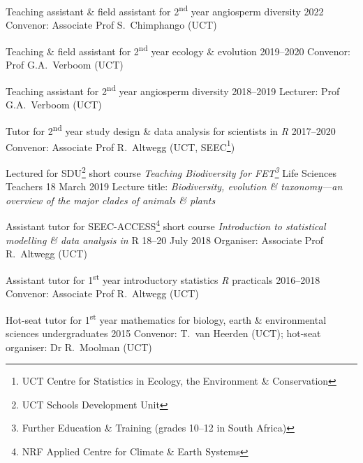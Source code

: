 \documentclass[10pt]{article}
\begin{document}
\begin{hangparas}{2em}{1}

Teaching assistant \& field assistant for 2\textsuperscript{nd} year angiosperm
diversity                                                     \hfill 2022 \break
Convenor: Associate Prof S.~Chimphango (UCT)

Teaching \& field assistant for 2\textsuperscript{nd} year ecology \& evolution
                                                        \hfill 2019--2020 \break
Convenor: Prof G.A.~Verboom (UCT)

Teaching assistant for 2\textsuperscript{nd} year angiosperm diversity
                                                        \hfill 2018--2019 \break
Lecturer: Prof G.A.~Verboom (UCT)

Tutor for 2\textsuperscript{nd} year study design \& data analysis for 
scientists in \textit{R}                                \hfill 2017--2020 \break
Convenor: Associate Prof R.~Altwegg (UCT, SEEC\footnote{UCT Centre for 
Statistics in Ecology, the Environment \& Conservation})

Lectured for SDU\footnote{UCT Schools Development Unit} short course 
\textit{Teaching Biodiversity for FET\footnote{Further Education \& Training
(grades 10--12 in South Africa)}} Life Sciences Teachers
                                                     \hfill 18 March 2019 \break
Lecture title: \textit{Biodiversity, evolution \& taxonomy---an overview of the 
major clades of animals \& plants}

Assistant tutor for SEEC-ACCESS\footnote{NRF Applied Centre for Climate \&
Earth Systems} short course \textit{Introduction to statistical modelling \&
data analysis in} R                               \hfill 18--20 July 2018 \break
Organiser: Associate Prof R.~Altwegg (UCT)

Assistant tutor for 1\textsuperscript{st} year introductory statistics
\textit{R} practicals                                   \hfill 2016--2018 \break
Convenor: Associate Prof R.~Altwegg (UCT)

Hot-seat tutor for 1\textsuperscript{st} year mathematics for biology, earth \& 
environmental sciences undergraduates                         \hfill 2015 \break
Convenor: T.~van Heerden (UCT); hot-seat organiser: Dr R.~Moolman (UCT)

\hfill

\end{hangparas}
\end{document}
